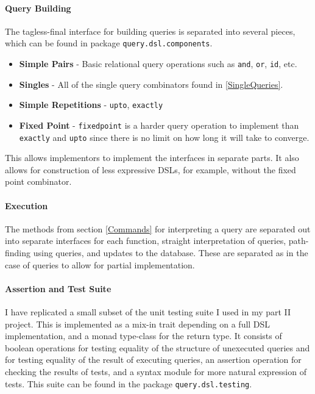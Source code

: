 \documentclass{report}
\newcommand \2[0]{\textbf{2}}
\newcommand \3[0]{\textbf{3}}
\begin{document}
\paragraph{Query Building}
The tagless-final interface for building queries is separated into several pieces, which can be found in package \texttt{query.dsl.components}.
\begin{itemize}
    \item \textbf{Simple Pairs} - Basic relational query operations such as \texttt{and}, \texttt{or}, \texttt{id}, etc.
    \item \textbf{Singles} - All of the single query combinators found in \ref{SingleQueries}.
    \item \textbf{Simple Repetitions} - \texttt{upto}, \texttt{exactly}
    \item \textbf{Fixed Point} - \texttt{fixedpoint} is a harder query operation to implement than \texttt{exactly} and \texttt{upto} since there is no limit on how long it will take to converge.
\end{itemize}

This allows implementors to implement the interfaces in separate parts. It also allows for construction of less expressive DSLs, for example, without the fixed point combinator.

\paragraph{Execution}
The methods from section \ref{Commands} for interpreting a query are separated out into separate interfaces for each function, straight interpretation of queries, path-finding using queries, and updates to the database. These are separated as in the case of queries to allow for partial implementation.

\paragraph{Assertion and Test Suite}
I have replicated a small subset of the unit testing suite I used in my part II project. This is implemented as a mix-in trait depending on a full DSL implementation, and a monad type-class for the return type. It consists of boolean operations for testing equality of the structure of unexecuted queries and for testing equality of the result of executing queries, an assertion operation for checking the results of tests, and a syntax module for more natural expression of tests. This suite can be found in the package \texttt{query.dsl.testing}.
\end{document}
